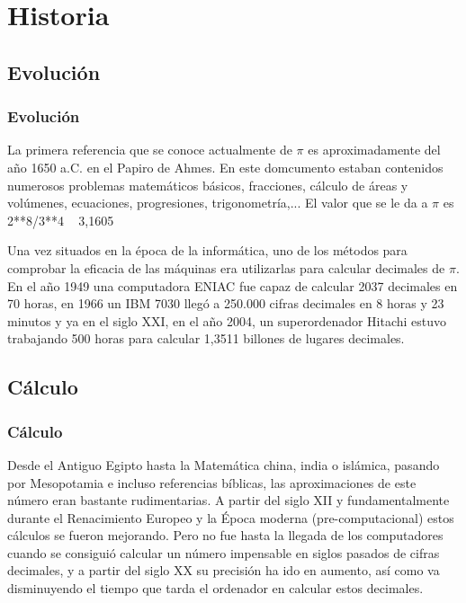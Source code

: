 \documentclass{beamer}
\begin{document}

 

\section{Historia}

\subsection{Evolución}
\begin{frame}
\frametitle{Evolución}

La primera referencia que se conoce actualmente de $\pi$ es aproximadamente del año 1650 a.C. en el Papiro de Ahmes. En este domcumento estaban contenidos numerosos problemas matemáticos básicos, fracciones, cálculo de áreas y volúmenes, ecuaciones, progresiones, trigonometría,... 
El valor que se le da a $\pi$ es 2**8/3**4 ~ 3,1605

Una vez situados en la época de la informática, uno de los métodos para comprobar la eficacia de las máquinas era utilizarlas para calcular decimales de $\pi$. En el año 1949 una computadora ENIAC fue capaz de calcular 2037 decimales en 70 horas, en 1966 un IBM 7030 llegó a 250.000 cifras decimales en 8 horas y 23 minutos y ya en el siglo XXI, en el año 2004, un superordenador Hitachi estuvo trabajando 500 horas para calcular 1,3511 billones de lugares decimales.
\end{frame}

\subsection{Cálculo}

\begin{frame}
\frametitle{Cálculo}

\begin{definition}

Desde el Antiguo Egipto hasta la Matemática china, india o islámica, pasando por Mesopotamia e incluso referencias bíblicas, las aproximaciones de este número eran bastante rudimentarias. 
A partir del siglo XII y fundamentalmente durante el Renacimiento Europeo y la Época moderna (pre-computacional) estos cálculos se fueron mejorando.
Pero no fue hasta la llegada de los computadores cuando se consiguió calcular un número impensable en siglos pasados de cifras decimales, y a partir del siglo XX su precisión ha ido en aumento, así como va disminuyendo el tiempo que tarda el ordenador en calcular estos decimales.
\end{definition}

\end{frame}
\end{document}
